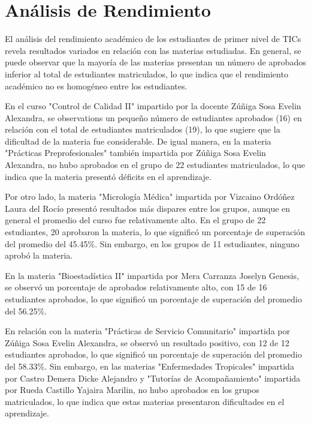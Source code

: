 \vspace{1cm}
\section{Análisis de Rendimiento}
El análisis del rendimiento académico de los estudiantes de primer nivel de TICs revela resultados variados en relación con las materias estudiadas. En general, se puede observar que la mayoría de las materias presentan un número de aprobados inferior al total de estudiantes matriculados, lo que indica que el rendimiento académico no es homogéneo entre los estudiantes.

En el curso "Control de Calidad II" impartido por la docente Zúñiga Sosa Evelin Alexandra, se observations un pequeño número de estudiantes aprobados (16) en relación con el total de estudiantes matriculados (19), lo que sugiere que la dificultad de la materia fue considerable. De igual manera, en la materia "Prácticas Preprofesionales" también impartida por Zúñiga Sosa Evelin Alexandra, no hubo aprobados en el grupo de 22 estudiantes matriculados, lo que indica que la materia presentó déficits en el aprendizaje.

Por otro lado, la materia "Micrología Médica" impartida por Vizcaino Ordóñez Laura del Rocío presentó resultados más dispares entre los grupos, aunque en general el promedio del curso fue relativamente alto. En el grupo de 22 estudiantes, 20 aprobaron la materia, lo que significó un porcentaje de superación del promedio del 45.45\%. Sin embargo, en los grupos de 11 estudiantes, ninguno aprobó la materia.

En la materia "Bioestadística II" impartida por Mera Carranza Joselyn Genesis, se observó un porcentaje de aprobados relativamente alto, con 15 de 16 estudiantes aprobados, lo que significó un porcentaje de superación del promedio del 56.25\%.

En relación con la materia "Prácticas de Servicio Comunitario" impartida por Zúñiga Sosa Evelin Alexandra, se observó un resultado positivo, con 12 de 12 estudiantes aprobados, lo que significó un porcentaje de superación del promedio del 58.33\%. Sin embargo, en las materias "Enfermedades Tropicales" impartida por Castro Demera Dicke Alejandro y "Tutorías de Acompañamiento" impartida por Rueda Castillo Yajaira Marilin, no hubo aprobados en los grupos matriculados, lo que indica que estas materias presentaron dificultades en el aprendizaje.

